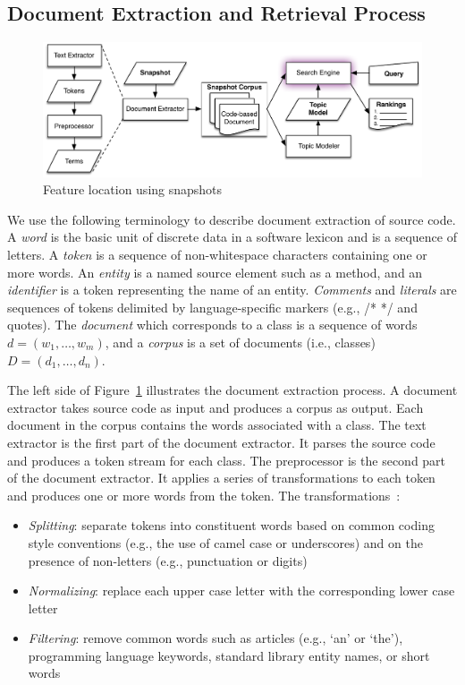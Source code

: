 


\subsection{Document Extraction and Retrieval Process}


\begin{figure}
\vspace{2mm}
\centerline{\includegraphics[width=.75\textwidth]{figures/snapshot-flt}}
\caption{Feature location using snapshots}
\label{fig:snapshot}
\vspace{-2mm}
\end{figure}

We use the following terminology to describe document extraction of source
code.  A \textit{word} is the basic unit of discrete data in a software lexicon
and is a sequence of letters.  A \textit{token} is a sequence of non-whitespace
characters containing one or more words.  An \textit{entity} is a named source
element such as a method, and an \textit{identifier} is a token representing
the name of an entity.  \textit{Comments} and \textit{literals} are sequences
of tokens delimited by language-specific markers (e.g., /* */ and quotes).  The
\textit{document} which corresponds to a class is a sequence of words $d =
(w_1, \ldots, w_m)$, and a \textit{corpus} is a set of documents (i.e.,
classes) $D = (d_1, \ldots, d_n)$.

The left side of Figure~\ref{fig:snapshot} illustrates the document extraction process.
A document extractor takes source code as input and produces a corpus as output.
Each document in the corpus contains the words associated with a class.
The text extractor is the first part of the document extractor.
It parses the source code and produces a token stream for each class.
The preprocessor is the second part of the document extractor.
It applies a series of transformations to each token and
produces one or more words from the token.
The transformations~\cite{Marcus-etal:2004,Marcus-Menzies:2010}: %
\begin{itemize}
    \item {\it Splitting}: separate tokens into constituent words
        based on common coding style conventions (e.g., the use of camel case or underscores)
        and on the presence of non-letters (e.g., punctuation or digits)
    \item {\it Normalizing}: replace each upper case letter with the corresponding
        lower case letter \item {\it Filtering}: remove common words such as
        articles (e.g., `an' or `the'),
        programming language keywords, standard library entity names, or short words
\end{itemize}

